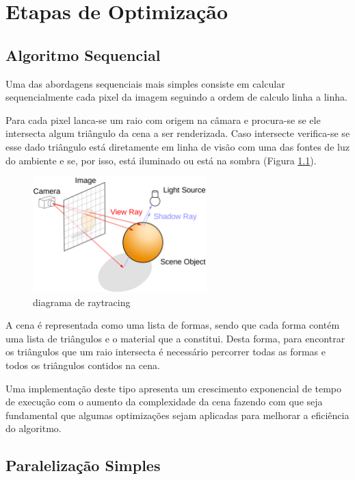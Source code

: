 \documentclass[a4paper]{report}
\begin{document}
\chapter{Etapas de Optimização}

\section{Algoritmo Sequencial}

Uma das abordagens sequenciais mais simples consiste em calcular sequencialmente
cada pixel da imagem seguindo a ordem de calculo linha a linha.

Para cada pixel lanca-se um raio com origem na câmara e procura-se se ele
intersecta algum triângulo da cena a ser renderizada. Caso intersecte
verifica-se se esse dado triângulo está diretamente em linha de visão com uma
das fontes de luz do ambiente e se, por isso, está iluminado ou está na sombra
(Figura \ref{fig:raytrace}).

\begin{figure}[h]
    \centering
        \includegraphics[width=0.6\textwidth]{images/Ray_trace_diagram.png}
        \caption{diagrama de raytracing}
        \label{fig:raytrace}
\end{figure}

A cena é representada como uma lista de formas, sendo que cada forma contém
uma lista de triângulos e o material que a constitui. Desta forma, para
encontrar os triângulos que um raio intersecta é necessário percorrer todas as
formas e todos os triângulos contidos na cena.

Uma implementação deste tipo apresenta um crescimento exponencial de tempo de
execução com o aumento da complexidade da cena fazendo com que seja fundamental
que algumas optimizações sejam aplicadas para melhorar a eficiência do
algoritmo.

\section{Paralelização Simples}
\end{document}
